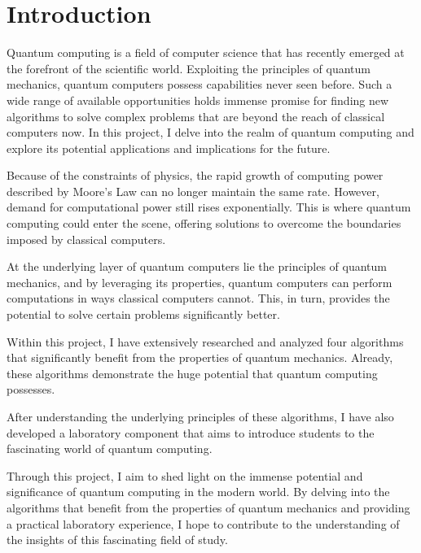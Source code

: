 
\chapter{Introduction} %

\label{Introduction} %


\newcommand{\keyword}[1]{\textbf{#1}}
\newcommand{\tabhead}[1]{\textbf{#1}}
\newcommand{\code}[1]{\texttt{#1}}
\newcommand{\file}[1]{\texttt{\bfseries#1}}
\newcommand{\option}[1]{\texttt{\itshape#1}}


Quantum computing is a field of computer science that has recently emerged at the forefront of the scientific world.
Exploiting the principles of quantum mechanics, quantum computers possess capabilities never seen before.
Such a wide range of available opportunities holds immense promise for finding new algorithms to solve complex problems that are beyond the reach of classical computers now.
In this project, I delve into the realm of quantum computing and explore its potential applications and implications for the future.

Because of the constraints of physics, the rapid growth of computing power described by Moore's Law can no longer maintain the same rate.
However, demand for computational power still rises exponentially.
This is where quantum computing could enter the scene, offering solutions to overcome the boundaries imposed by classical computers.

At the underlying layer of quantum computers lie the principles of quantum mechanics, and by leveraging its properties, quantum computers can perform computations in ways classical computers cannot.
This, in turn, provides the potential to solve certain problems significantly better.

Within this project, I have extensively researched and analyzed four algorithms that significantly benefit from the properties of quantum mechanics.
Already, these algorithms demonstrate the huge potential that quantum computing possesses.

After understanding the underlying principles of these algorithms, I have also developed a laboratory component that aims to introduce students to the fascinating world of quantum computing.

Through this project, I aim to shed light on the immense potential and significance of quantum computing in the modern world.
By delving into the algorithms that benefit from the properties of quantum mechanics and providing a practical laboratory experience, I hope to contribute to the understanding of the insights of this fascinating field of study.




